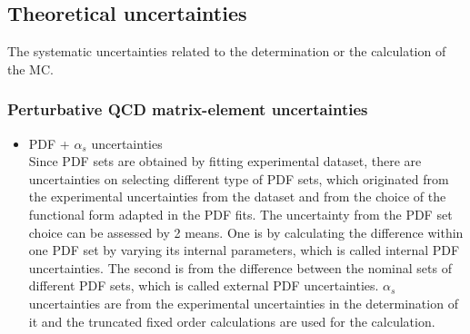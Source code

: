 \subsection{Theoretical uncertainties}
The systematic uncertainties related to the determination or the calculation of the MC.
\subsubsection{Perturbative QCD matrix-element uncertainties}
\begin{itemize}
      \item PDF + $\alpha_s$ uncertainties\\
      Since PDF sets are obtained by fitting experimental dataset, there are uncertainties on selecting different type of PDF sets, which originated from the experimental uncertainties from the dataset and from the choice of the functional form adapted in the PDF fits.
      The uncertainty from the PDF set choice can be assessed by 2 means. One is by calculating the difference within one PDF set by varying its internal parameters, which is called internal PDF uncertainties. The second is from the difference between the nominal sets of different PDF sets, which is called external PDF uncertainties.
      $\alpha_s$ uncertainties are from the experimental uncertainties in the determination of it and the truncated fixed order calculations are used for the calculation.
     
\end{itemize}
